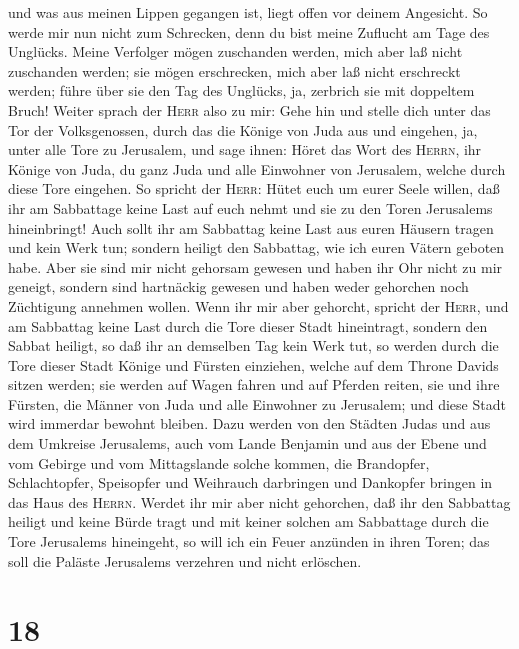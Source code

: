 und was aus meinen Lippen gegangen ist, liegt offen vor deinem
Angesicht.  So werde mir nun nicht zum Schrecken, denn du
bist meine Zuflucht am Tage des Unglücks.  Meine
Verfolger mögen zuschanden werden, mich aber laß nicht zuschanden
werden; sie mögen erschrecken, mich aber laß nicht erschreckt werden;
führe über sie den Tag des Unglücks, ja, zerbrich sie mit doppeltem
Bruch!  Weiter sprach der \textsc{Herr} also zu mir: Gehe
hin und stelle dich unter das Tor der Volksgenossen, durch das die
Könige von Juda aus und eingehen, ja, unter alle Tore zu Jerusalem, und
sage ihnen:  Höret das Wort des \textsc{Herrn}, ihr
Könige von Juda, du ganz Juda und alle Einwohner von Jerusalem, welche
durch diese Tore eingehen.  So spricht der \textsc{Herr}:
Hütet euch um eurer Seele willen, daß ihr am Sabbattage keine Last auf
euch nehmt und sie zu den Toren Jerusalems hineinbringt! 
Auch sollt ihr am Sabbattag keine Last aus euren Häusern tragen und kein
Werk tun; sondern heiligt den Sabbattag, wie ich euren Vätern geboten
habe.  Aber sie sind mir nicht gehorsam gewesen und haben
ihr Ohr nicht zu mir geneigt, sondern sind hartnäckig gewesen und haben
weder gehorchen noch Züchtigung annehmen wollen.  Wenn
ihr mir aber gehorcht, spricht der \textsc{Herr}, und am Sabbattag keine
Last durch die Tore dieser Stadt hineintragt, sondern den Sabbat
heiligt, so daß ihr an demselben Tag kein Werk tut,  so
werden durch die Tore dieser Stadt Könige und Fürsten einziehen, welche
auf dem Throne Davids sitzen werden; sie werden auf Wagen fahren und auf
Pferden reiten, sie und ihre Fürsten, die Männer von Juda und alle
Einwohner zu Jerusalem; und diese Stadt wird immerdar bewohnt bleiben.
 Dazu werden von den Städten Judas und aus dem Umkreise
Jerusalems, auch vom Lande Benjamin und aus der Ebene und vom Gebirge
und vom Mittagslande solche kommen, die Brandopfer, Schlachtopfer,
Speisopfer und Weihrauch darbringen und Dankopfer bringen in das Haus
des \textsc{Herrn}.  Werdet ihr mir aber nicht gehorchen,
daß ihr den Sabbattag heiligt und keine Bürde tragt und mit keiner
solchen am Sabbattage durch die Tore Jerusalems hineingeht, so will ich
ein Feuer anzünden in ihren Toren; das soll die Paläste Jerusalems
verzehren und nicht erlöschen.

\hypertarget{section-17}{%
\section{18}\label{section-17}}

